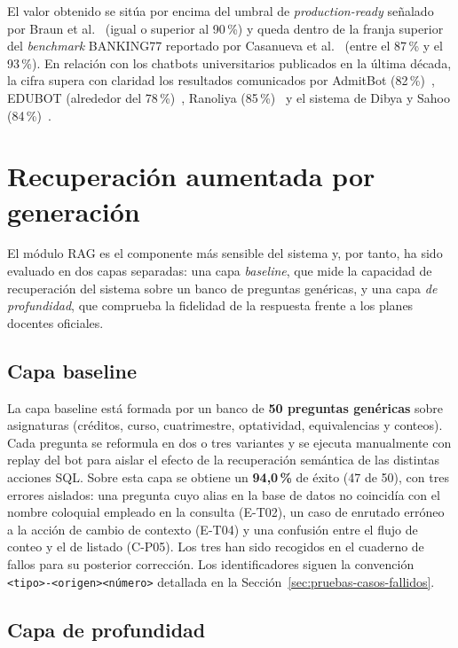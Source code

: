 El valor obtenido se sitúa por encima del umbral de \textit{production-ready} señalado por Braun et al.~\cite{braun2017evaluating} (igual o superior al 90\,\%) y queda dentro de la franja superior del \textit{benchmark} BANKING77 reportado por Casanueva et al.~\cite{casanueva2020efficient} (entre el 87\,\% y el 93\,\%). En relación con los chatbots universitarios publicados en la última década, la cifra supera con claridad los resultados comunicados por AdmitBot (82\,\%)~\cite{gupta2019admitbot}, EDUBOT (alrededor del 78\,\%)~\cite{colace2018edubot}, Ranoliya (85\,\%)~\cite{ranoliya2017chatbot} y el sistema de Dibya y Sahoo (84\,\%)~\cite{dibya2021chatbot}.

\section{Recuperación aumentada por generación}\label{sec:pruebas-rag}

El módulo RAG es el componente más sensible del sistema y, por tanto, ha sido evaluado en dos capas separadas: una capa \textit{baseline}, que mide la capacidad de recuperación del sistema sobre un banco de preguntas genéricas, y una capa \textit{de profundidad}, que comprueba la fidelidad de la respuesta frente a los planes docentes oficiales.

\subsection{Capa baseline}\label{subsec:rag-baseline}

La capa baseline está formada por un banco de \textbf{50 preguntas genéricas} sobre asignaturas (créditos, curso, cuatrimestre, optatividad, equivalencias y conteos). Cada pregunta se reformula en dos o tres variantes y se ejecuta manualmente con replay del bot para aislar el efecto de la recuperación semántica de las distintas acciones SQL. Sobre esta capa se obtiene un \textbf{94,0\,\%} de éxito (47 de 50), con tres errores aislados: una pregunta cuyo alias en la base de datos no coincidía con el nombre coloquial empleado en la consulta (E-T02), un caso de enrutado erróneo a la acción de cambio de contexto (E-T04) y una confusión entre el flujo de conteo y el de listado (C-P05). Los tres han sido recogidos en el cuaderno de fallos para su posterior corrección. Los identificadores siguen la convención \texttt{<tipo>-<origen><número>} detallada en la Sección~\ref{sec:pruebas-casos-fallidos}.

\subsection{Capa de profundidad}\label{subsec:rag-profundidad}

